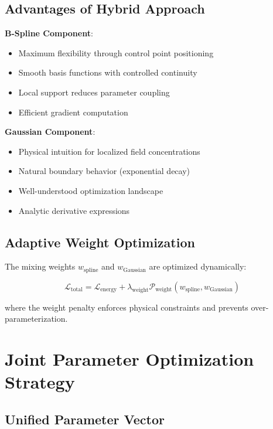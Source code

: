 \documentclass[11pt,a4paper]{article}
\begin{document}
\subsection{Advantages of Hybrid Approach}

\textbf{B-Spline Component}:
\begin{itemize}
\item Maximum flexibility through control point positioning
\item Smooth basis functions with controlled continuity
\item Local support reduces parameter coupling
\item Efficient gradient computation
\end{itemize}

\textbf{Gaussian Component}:
\begin{itemize}
\item Physical intuition for localized field concentrations
\item Natural boundary behavior (exponential decay)
\item Well-understood optimization landscape
\item Analytic derivative expressions
\end{itemize}

\subsection{Adaptive Weight Optimization}

The mixing weights $w_{\text{spline}}$ and $w_{\text{Gaussian}}$ are optimized dynamically:

\begin{equation}
\mathcal{L}_{\text{total}} = \mathcal{L}_{\text{energy}} + \lambda_{\text{weight}} \mathcal{P}_{\text{weight}}(w_{\text{spline}}, w_{\text{Gaussian}})
\end{equation}

where the weight penalty enforces physical constraints and prevents over-parameterization.

\section{Joint Parameter Optimization Strategy}

\subsection{Unified Parameter Vector}
\end{document}
